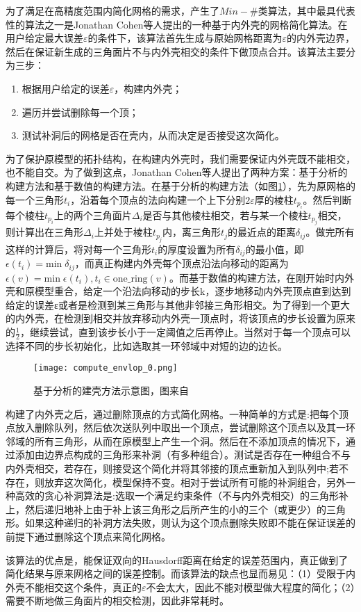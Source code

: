 为了满足在高精度范围内简化网格的需求，产生了$Min−\#$类算法，其中最具代表性的算法之一是Jonathan Cohen等人提出的一种基于内外壳的网格简化算法\cite{simp-envlop}。在用户给定最大误差$\varepsilon$的条件下，该算法首先生成与原始网格距离为$\varepsilon$的内外壳边界，然后在保证新生成的三角面片不与内外壳相交的条件下做顶点合并。该算法主要分为三步：
\begin{enumerate}[（1）]
  \item 根据用户给定的误差$\varepsilon$，构建内外壳；
  \item 遍历并尝试删除每一个顶；
  \item 测试补洞后的网格是否在壳内，从而决定是否接受这次简化。
\end{enumerate}
\par 为了保护原模型的拓扑结构，在构建内外壳时，我们需要保证内外壳既不能相交，也不能自交。为了做到这点，Jonathan Cohen等人提出了两种方案：基于分析的构建方法和基于数值的构建方法。在基于分析的构建方法（如图\ref{fig:compute-envlop0}），先为原网格的每一个三角形$t_i$，沿着每个顶点的法向构建一个上下分别$2\varepsilon$厚的棱柱$t_{p_i}$。然后判断每个棱柱$t_{p_i}$上的两个三角面片$\Delta_i$是否与其他棱柱相交，若与某一个棱柱$t_{p_j}$相交，则计算出在三角形$\Delta_i$上并处于棱柱$t_{p_j}$内，离三角形$t_j$的最近点的距离$\delta_{ij}$。做完所有这样的计算后，将对每一个三角形$t_i$的厚度设置为所有$\delta_{ij}$的最小值，即$\epsilon(t_i) = \text{min} \; \delta_{ij}$，而真正构建内外壳每个顶点沿法向移动的距离为$\epsilon(v) = \text{min} \; \epsilon(t_i),t_i \in \text{one\_ring}(v)$。而基于数值的构建方法，在刚开始时内外壳和原模型重合，给定一个沿法向移动的步长k，逐步地移动内外壳顶点直到达到给定的误差ε或者是检测到某三角形与其他非邻接三角形相交。为了得到一个更大的内外壳，在检测到相交并放弃移动内外壳一顶点时，将该顶点的步长设置为原来的$\frac{1}{2}$，继续尝试，直到该步长小于一定阈值之后再停止。当然对于每一个顶点可以选择不同的步长初始化，比如选取其一环邻域中对短的边的边长。\par
\begin{figure}[htbp]
    \centering
    \texttt{[image: compute\_envlop\_0.png]}
    \caption[分析建壳方法]{基于分析的建壳方法示意图，图来自\cite{simp-envlop}}
    \label{fig:compute-envlop0}
\end{figure}
构建了内外壳之后，通过删除顶点的方式简化网格。一种简单的方式是:把每个顶点放入删除队列，然后依次送队列中取出一个顶点，尝试删除这个顶点以及其一环邻域的所有三角形，从而在原模型上产生一个洞。然后在不添加顶点的情况下，通过添加由边界点构成的三角形来补洞（有多种组合）。测试是否存在一种组合不与内外壳相交，若存在，则接受这个简化并将其邻接的顶点重新加入到队列中;若不存在，则放弃这次简化，模型保持不变。相对于尝试所有可能的补洞组合，另外一种高效的贪心补洞算法是:选取一个满足约束条件（不与内外壳相交）的三角形补上，然后递归地补上由于补上该三角形之后所产生的小的三个（或更少）的三角形。如果这种递归的补洞方法失败，则认为这个顶点删除失败即不能在保证误差的前提下通过删除这个顶点来简化网格。\par
该算法的优点是，能保证双向的Hausdorff距离在给定的误差范围内，真正做到了简化结果与原来网格之间的误差控制。而该算法的缺点也显而易见：（1）受限于内外壳不能相交这个条件，真正的$\varepsilon$不会太大，因此不能对模型做大程度的简化；（2）需要不断地做三角面片的相交检测，因此非常耗时。


